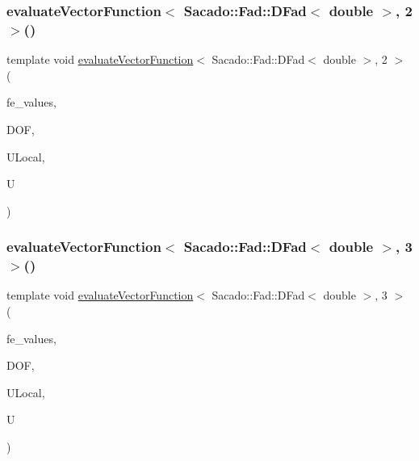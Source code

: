 \subsubsection{\texorpdfstring{evaluateVectorFunction$<$ Sacado::Fad::DFad$<$ double $>$, 2 $>$()}{evaluateVectorFunction< Sacado::Fad::DFad< double >, 2 >()}}
{\footnotesize\ttfamily template void \mbox{\hyperlink{group___evaluation_functions_gab9e164be1be244df81c932426a4bd513}{evaluate\+Vector\+Function}}$<$ Sacado\+::\+Fad\+::\+D\+Fad$<$ double $>$, 2 $>$ (\begin{DoxyParamCaption}\item[{const F\+E\+Values$<$ 2 $>$ \&}]{fe\+\_\+values,  }\item[{unsigned int}]{D\+OF,  }\item[{Table$<$ 1, Sacado\+::\+Fad\+::\+D\+Fad$<$ double $>$$>$ \&}]{U\+Local,  }\item[{Table$<$ 2, Sacado\+::\+Fad\+::\+D\+Fad$<$ double $>$$>$ \&}]{U }\end{DoxyParamCaption})}

\mbox{\label{function_evaluations_8cc_a49bf826d13c295bef33c6d320e96a6ee}} 
\subsubsection{\texorpdfstring{evaluateVectorFunction$<$ Sacado::Fad::DFad$<$ double $>$, 3 $>$()}{evaluateVectorFunction< Sacado::Fad::DFad< double >, 3 >()}}
{\footnotesize\ttfamily template void \mbox{\hyperlink{group___evaluation_functions_gab9e164be1be244df81c932426a4bd513}{evaluate\+Vector\+Function}}$<$ Sacado\+::\+Fad\+::\+D\+Fad$<$ double $>$, 3 $>$ (\begin{DoxyParamCaption}\item[{const F\+E\+Values$<$ 3 $>$ \&}]{fe\+\_\+values,  }\item[{unsigned int}]{D\+OF,  }\item[{Table$<$ 1, Sacado\+::\+Fad\+::\+D\+Fad$<$ double $>$$>$ \&}]{U\+Local,  }\item[{Table$<$ 2, Sacado\+::\+Fad\+::\+D\+Fad$<$ double $>$$>$ \&}]{U }\end{DoxyParamCaption})}

